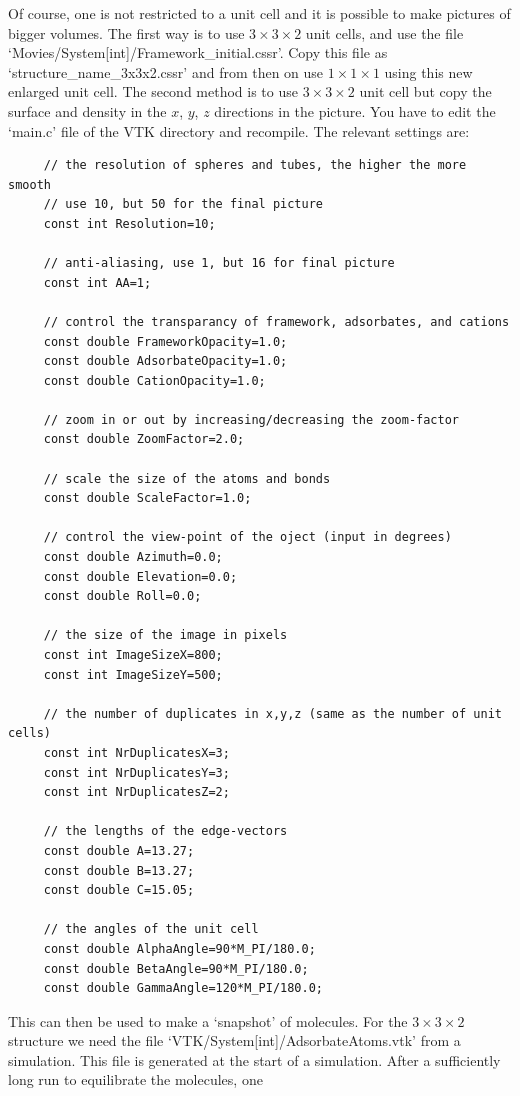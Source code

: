 Of course, one is not restricted to a unit cell and it is possible to make pictures of bigger volumes.
The first way is to use $3\times3\times2$ unit cells, and use the file `Movies/System[int]/Framework\_initial.cssr'.
Copy this file as `structure\_name\_3x3x2.cssr' and from then on use $1\times1\times1$ using this new enlarged unit cell.
The second method is to use $3\times3\times2$ unit cell but copy the surface and density in the $x$, $y$, $z$ directions
in the picture. You have to edit the `main.c' file of the VTK directory and recompile. The relevant settings are:
\begin{verbatim}
     // the resolution of spheres and tubes, the higher the more smooth
     // use 10, but 50 for the final picture
     const int Resolution=10;

     // anti-aliasing, use 1, but 16 for final picture
     const int AA=1;

     // control the transparancy of framework, adsorbates, and cations
     const double FrameworkOpacity=1.0;
     const double AdsorbateOpacity=1.0;
     const double CationOpacity=1.0;

     // zoom in or out by increasing/decreasing the zoom-factor
     const double ZoomFactor=2.0;

     // scale the size of the atoms and bonds
     const double ScaleFactor=1.0;

     // control the view-point of the oject (input in degrees)
     const double Azimuth=0.0;
     const double Elevation=0.0;
     const double Roll=0.0;

     // the size of the image in pixels
     const int ImageSizeX=800;
     const int ImageSizeY=500;

     // the number of duplicates in x,y,z (same as the number of unit cells)
     const int NrDuplicatesX=3;
     const int NrDuplicatesY=3;
     const int NrDuplicatesZ=2;

     // the lengths of the edge-vectors
     const double A=13.27;
     const double B=13.27;
     const double C=15.05;

     // the angles of the unit cell
     const double AlphaAngle=90*M_PI/180.0;
     const double BetaAngle=90*M_PI/180.0;
     const double GammaAngle=120*M_PI/180.0;
\end{verbatim}
This can then be used to make a `snapshot' of molecules. For the $3\times3\times2$ structure we need the file
`VTK/System[int]/AdsorbateAtoms.vtk' from a simulation. This file is generated at the start of a simulation. 
After a sufficiently long run to equilibrate the molecules, one
